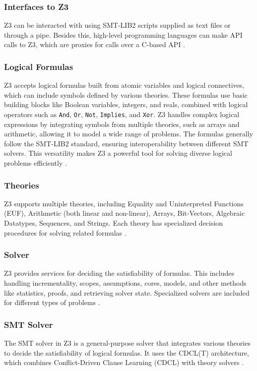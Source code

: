 \documentclass[]{rptuseminar}
\begin{document}
\subsubsection{Interfaces to Z3}
Z3 can be interacted with using SMT-LIB2 scripts supplied as text ﬁles or through a pipe.
Besides this, high-level programming languages can make API calls to Z3, which are proxies
for calls over a C-based API \cite{nikolaj_bjorner_programming_nodate}.

\subsubsection{Logical Formulas}
Z3 accepts logical formulas built from atomic variables and logical connectives, which can include symbols defined by various theories.
These formulas use basic building blocks like Boolean variables, integers, and reals, combined with logical operators such as
\texttt{And}, \texttt{Or}, \texttt{Not}, \texttt{Implies}, and \texttt{Xor}. Z3 handles complex logical expressions by
integrating symbols from multiple theories, such as arrays and arithmetic, allowing it to model a wide range of problems.
The formulas generally follow the SMT-LIB2 standard, ensuring interoperability between different SMT solvers. 
This versatility makes Z3 a powerful tool for solving diverse logical problems efficiently \cite{nikolaj_bjorner_programming_nodate}.

\subsubsection{Theories}
Z3 supports multiple theories, including Equality and Uninterpreted Functions (EUF), Arithmetic (both linear and non-linear),
Arrays, Bit-Vectors, Algebraic Datatypes, Sequences, and Strings. Each theory has specialized decision procedures for solving
related formulas \cite{nikolaj_bjorner_programming_nodate}.


\subsubsection{Solver}
Z3 provides services for deciding the satisfiability of formulas. This includes handling incrementality, scopes, assumptions, 
cores, models, and other methods like statistics, proofs, and retrieving solver state. Specialized solvers are included for 
different types of problems \cite{nikolaj_bjorner_programming_nodate}.

\subsubsection*{SMT Solver}
The SMT solver in Z3 is a general-purpose solver that integrates various theories to decide the satisfiability of logical formulas. 
It uses the CDCL(T) architecture, which combines Conflict-Driven Clause Learning (CDCL) with theory solvers \cite{nikolaj_bjorner_programming_nodate}.
\end{document}
